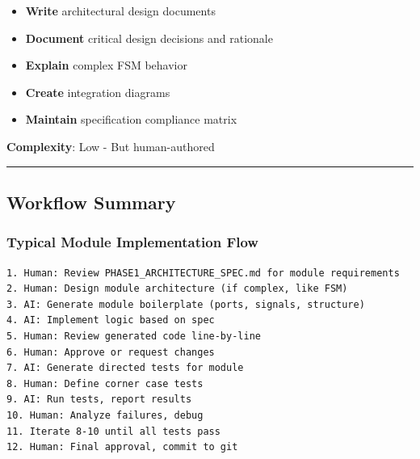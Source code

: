\begin{record}

\begin{itemize}
\tightlist
\item
  \textbf{Write} architectural design documents
\item
  \textbf{Document} critical design decisions and rationale
\item
  \textbf{Explain} complex FSM behavior
\item
  \textbf{Create} integration diagrams
\item
  \textbf{Maintain} specification compliance matrix
\end{itemize}

\textbf{Complexity}: \ok{} Low - But human-authored

\begin{center}\rule{0.5\linewidth}{0.5pt}\end{center}

\end{record}

\subsection{Workflow Summary}\label{cr:status:phase1-ai-human-responsibilities:workflow-summary}

\subsubsection{Typical Module Implementation Flow}\label{cr:status:phase1-ai-human-responsibilities:typical-module-implementation-flow}

\begin{record}

\begin{lstlisting}[language={}]
1. Human: Review PHASE1_ARCHITECTURE_SPEC.md for module requirements
2. Human: Design module architecture (if complex, like FSM)
3. AI: Generate module boilerplate (ports, signals, structure)
4. AI: Implement logic based on spec
5. Human: Review generated code line-by-line
6. Human: Approve or request changes
7. AI: Generate directed tests for module
8. Human: Define corner case tests
9. AI: Run tests, report results
10. Human: Analyze failures, debug
11. Iterate 8-10 until all tests pass
12. Human: Final approval, commit to git
\end{lstlisting}

\end{record}

